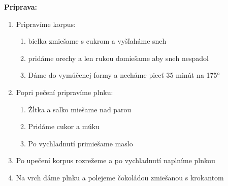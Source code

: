 \begin{recipe}
\textbf{ {\normalsize Príprava:} }
\begin{enumerate}

  \item{Pripravíme korpus: }
      \begin{enumerate}
          \item{bielka zmiešame s cukrom a vyšľaháme sneh}
          \item{pridáme orechy a len rukou domiešame aby sneh nespadol}
          \item{Dáme do vymúčenej formy a necháme piecť 35 minút na 175°}\end{enumerate}
  \item{Popri pečení pripravíme plnku: }
      \begin{enumerate}
          \item{Žĺtka a salko miešame nad parou}
          \item{Pridáme cukor a múku}
          \item{Po vychladnutí primiešame maslo}\end{enumerate}
  \item{Po upečení korpus rozrežeme a po vychladnutí naplníme plnkou}
  \item{Na vrch dáme plnku a polejeme čokoládou zmiešanou s krokantom}

\end{enumerate}
\end{recipe}

\begin{notes}
  
\end{notes}	
\clearpage
